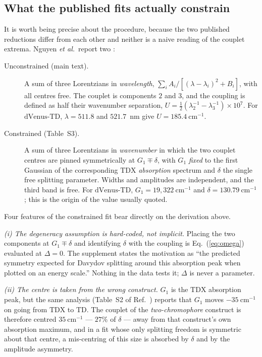 \documentclass[11pt,a4paper]{article}
\begin{document}
\subsection{What the published fits actually constrain}
\label{sec:published}

It is worth being precise about the procedure, because the two published
reductions differ from each other and neither is a naive reading of the couplet
extrema. Nguyen \emph{et al.}\ report two \cite{nguyen2025}:

\begin{description}
\item[Unconstrained (main text).] A sum of three Lorentzians in
\emph{wavelength}, $\sum_i A_i/[(\lambda-\lambda_i)^{2}+B_i]$, with all centres
free. The couplet is components $2$ and $3$, and the coupling is defined as
half their wavenumber separation,
$U=\tfrac{1}{2}(\lambda_{2}^{-1}-\lambda_{3}^{-1})\times10^{7}$. For
$\mathrm{dVenus\mbox{-}TD}$, $\lambda=511.8$ and $521.7$~nm give
$U=185.4~\mathrm{cm^{-1}}$.
\item[Constrained (Table~S3).] A sum of three Lorentzians in \emph{wavenumber}
in which the two couplet centres are pinned symmetrically at $G_{1}\mp\delta$,
with $G_{1}$ \emph{fixed} to the first Gaussian of the corresponding
$\mathrm{TDX}$ \emph{absorption} spectrum and $\delta$ the single free
splitting parameter. Widths and amplitudes are independent, and the third band
is free. For $\mathrm{dVenus\mbox{-}TD}$, $G_{1}=19{,}322~\mathrm{cm^{-1}}$ and
$\delta=130.79~\mathrm{cm^{-1}}$; this is the origin of the value usually
quoted.
\end{description}

Four features of the constrained fit bear directly on the derivation above.

\emph{(i) The degeneracy assumption is hard-coded, not implicit.} Placing the
two components at $G_{1}\mp\delta$ and identifying $\delta$ with the coupling
is Eq.~(\ref{eq:omega}) evaluated at $\Delta=0$. The supplement states the
motivation as ``the predicted symmetry expected for Davydov splitting around
this absorption peak when plotted on an energy scale.'' Nothing in the data
tests it; $\Delta$ is never a parameter.

\emph{(ii) The centre is taken from the wrong construct.} $G_{1}$ is the
$\mathrm{TDX}$ absorption peak, but the same analysis (Table~S2 of
Ref.~\cite{nguyen2025}) reports that $G_{1}$ moves $-35~\mathrm{cm^{-1}}$ on
going from $\mathrm{TDX}$ to $\mathrm{TD}$. The couplet of the
\emph{two-chromophore} construct is therefore centred $35~\mathrm{cm^{-1}}$
--- $27\%$ of $\delta$ --- away from that construct's own absorption maximum,
and in a fit whose only splitting freedom is symmetric about that centre, a
mis-centring of this size is absorbed by $\delta$ and by the amplitude
asymmetry.
\end{document}
